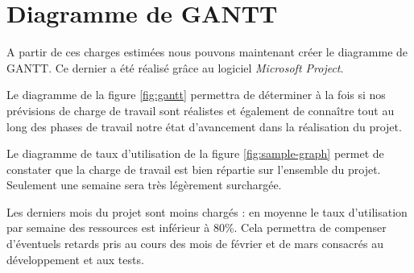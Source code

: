 \documentclass[a4paper]{report}
\begin{document}
\chapter{Diagramme de GANTT}

A partir de ces charges estimées nous pouvons maintenant créer le diagramme de GANTT. Ce dernier a été réalisé grâce au logiciel \emph{Microsoft Project}.

Le diagramme de la figure \ref{fig:gantt} permettra de déterminer à la fois si nos prévisions de charge de travail sont réalistes et également de connaître tout au long des phases de travail notre état d'avancement dans la réalisation du projet.


\vspace{0.5cm}

Le diagramme de taux d'utilisation de la figure \ref{fig:sample-graph} permet de constater que la charge de travail est bien répartie sur l'ensemble du projet. Seulement une semaine sera très légèrement surchargée.

Les derniers mois du projet sont moins chargés : en moyenne le taux d'utilisation par semaine des ressources est inférieur à 80\%. Cela permettra de compenser d'éventuels retards pris au cours des mois de février et de mars consacrés au développement et aux tests.
\end{document}
